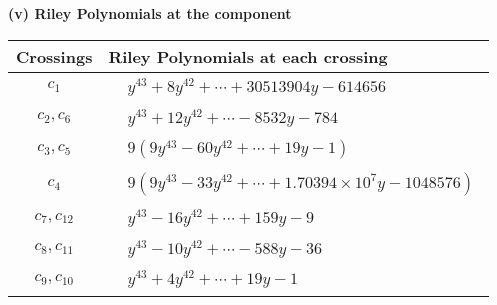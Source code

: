 \documentclass[1p]{elsarticle_modified}
\theoremstyle{definition}
\begin{document}
\flushleft \textbf{(v) Riley Polynomials at the component}\newline \\
\begin{tabular}{m{50pt}|m{274pt}}
Crossings & \hspace{64pt}Riley Polynomials at each crossing \\
\hline $$\begin{aligned}c_{1}\end{aligned}$$&$\begin{aligned}
&y^{43}+8 y^{42}+\cdots+30513904 y-614656
\end{aligned}$\\
\hline $$\begin{aligned}c_{2},c_{6}\end{aligned}$$&$\begin{aligned}
&y^{43}+12 y^{42}+\cdots-8532 y-784
\end{aligned}$\\
\hline $$\begin{aligned}c_{3},c_{5}\end{aligned}$$&$\begin{aligned}
&9(9 y^{43}-60 y^{42}+\cdots+19 y-1)
\end{aligned}$\\
\hline $$\begin{aligned}c_{4}\end{aligned}$$&$\begin{aligned}
&9(9 y^{43}-33 y^{42}+\cdots+1.70394\times10^{7} y-1048576)
\end{aligned}$\\
\hline $$\begin{aligned}c_{7},c_{12}\end{aligned}$$&$\begin{aligned}
&y^{43}-16 y^{42}+\cdots+159 y-9
\end{aligned}$\\
\hline $$\begin{aligned}c_{8},c_{11}\end{aligned}$$&$\begin{aligned}
&y^{43}-10 y^{42}+\cdots-588 y-36
\end{aligned}$\\
\hline $$\begin{aligned}c_{9},c_{10}\end{aligned}$$&$\begin{aligned}
&y^{43}+4 y^{42}+\cdots+19 y-1
\end{aligned}$\\
\hline
\end{tabular}\\~\\
\end{document}
